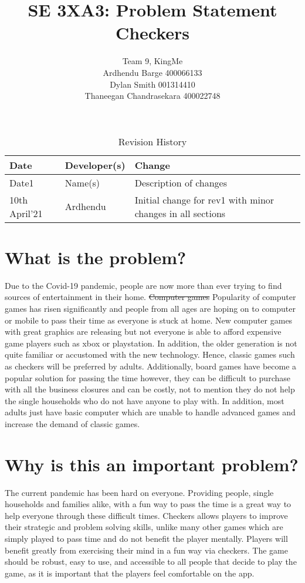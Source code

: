 \documentclass{article}
\title{SE 3XA3: Problem Statement\\Checkers}
\author{Team 9, KingMe
		\\ Ardhendu Barge 400066133
		\\ Dylan Smith 001314410
		\\ Thaneegan Chandrasekara 400022748
}
\date{}
\begin{document}
\begin{table}[hp]
\caption{Revision History} \label{TblRevisionHistory}
\begin{tabularx}{\textwidth}{llX}
\toprule
\textbf{Date} & \textbf{Developer(s)} & \textbf{Change}\\
\midrule
Date1 & Name(s) & Description of changes\\
10th April'21 & Ardhendu & Initial change for rev1 with minor changes in all sections\\
\bottomrule
\end{tabularx}
\end{table}

\newpage

\maketitle

\section{What is the problem?}
Due to the Covid-19 pandemic, people are now more than ever trying to find sources of entertainment {\color{blue} in their home}. \st{Computer games}  {\color{blue}Popularity of computer games} has risen significantly and people from all ages are hoping on to computer or mobile to pass their time as everyone is stuck at home. New computer games with great graphics are releasing but not everyone is able to afford expensive game players such as xbox or playstation. In addition, the older generation is not quite familiar or accustomed  with the new technology. Hence, classic games such as checkers will be preferred by adults. Additionally, board games have become a popular solution for passing the time however, they can be difficult to purchase with all the business closures and can be costly, not to mention they do not help the single households who do not have anyone to play with. {\color{blue} In addition, most adults just have basic computer which are unable to handle advanced games and increase the demand of classic games.}

\section{Why is this an important problem?}
The current pandemic has been hard on everyone. Providing people, single households and families alike, with a fun way to pass the time is a great way to help everyone through these difficult times. Checkers allows players to improve their strategic and problem solving skills, unlike many other games which are simply played to pass time and do not benefit the player mentally. Players will benefit greatly from exercising their mind in a fun way via checkers. The game should be robust, easy to use, and accessible to all people that decide to play the game, as it is important that the players feel comfortable on the app.
\end{document}
